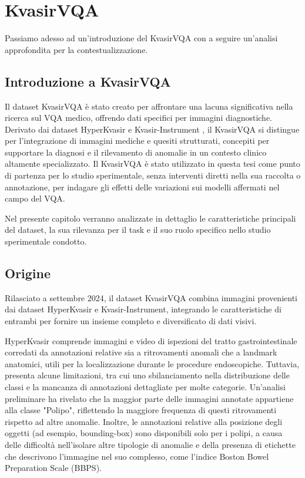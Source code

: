 \documentclass[../main.tex]{subfiles}
\begin{document}
\section{KvasirVQA}

Passiamo adesso ad un'introduzione del KvasirVQA con a seguire un'analisi approfondita per la contestualizzazione.

\subsection{Introduzione a KvasirVQA}

Il dataset KvasirVQA è stato creato per affrontare una lacuna significativa nella ricerca sul VQA medico, offrendo dati specifici per immagini diagnostiche. 
Derivato dai dataset HyperKvasir \cite{borgli2020hyperkvasir} e Kvasir-Instrument \cite{borgli2020hyperkvasir}, il KvasirVQA \cite{gautam2024kvasirvqa} si distingue per l'integrazione di immagini mediche e quesiti strutturati, concepiti per supportare la diagnosi e il rilevamento di anomalie in un contesto clinico altamente specializzato.
Il KvasirVQA è stato utilizzato in questa tesi come punto di partenza per lo studio sperimentale, senza interventi diretti nella sua raccolta o annotazione, per indagare gli effetti delle variazioni sui modelli affermati nel campo del VQA.

Nel presente capitolo verranno analizzate in dettaglio le caratteristiche principali del dataset, la sua rilevanza per il task e il suo ruolo specifico nello studio sperimentale condotto.

\subsection{Origine}

Rilasciato a settembre 2024, il dataset KvasirVQA combina immagini provenienti dai dataset HyperKvasir e Kvasir-Instrument, integrando le caratteristiche di entrambi per fornire un insieme completo e diversificato di dati visivi.

HyperKvasir comprende immagini e video di ispezioni del tratto gastrointestinale corredati da annotazioni relative sia a ritrovamenti anomali che a landmark anatomici, utili per la localizzazione durante le procedure endoscopiche. 
Tuttavia, presenta alcune limitazioni, tra cui uno sbilanciamento nella distribuzione delle classi e la mancanza di annotazioni dettagliate per molte categorie. 
Un'analisi preliminare ha rivelato che la maggior parte delle immagini annotate appartiene alla classe "Polipo", riflettendo la maggiore frequenza di questi ritrovamenti rispetto ad altre anomalie. 
Inoltre, le annotazioni relative alla posizione degli oggetti (ad esempio, bounding-box) sono disponibili solo per i polipi, a causa delle difficoltà nell'isolare altre tipologie di anomalie e della presenza di etichette che descrivono l'immagine nel suo complesso, come l'indice Boston Bowel Preparation Scale (BBPS).
\end{document}

